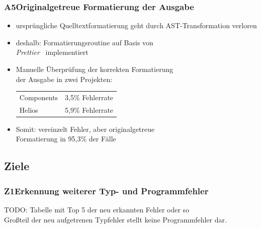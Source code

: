       \begin{frame}
        \frametitle{A5\hspace{0.75em}Originalgetreue Formatierung der Ausgabe}
        \begin{itemize}
          \item ursprüngliche Quelltextformatierung geht durch AST-Transformation verloren
          \item deshalb: Formatierungsroutine auf Basis von\\\textit{Prettier}~\autocite{SOFTWARE:PRETTIER} implementiert
          \item Manuelle Überprüfung der korrekten Formatierung\\der Ausgabe in zwei Projekten:\\
            \medskip
            {
              \footnotesize
              \begin{tabu} to 
                Components & 3,5\% Fehlerrate \\
                Helios     & 5,9\% Fehlerrate \\
              \end{tabu}
            }
          \item Somit: vereinzelt Fehler, aber originalgetreue\\Formatierung in 95,3\% der Fälle
        \end{itemize}
      \end{frame}

    \subsection{Ziele}

      \begin{frame}
        \frametitle{Z1\hspace{0.75em}Erkennung weiterer Typ- und Programmfehler}

        TODO: Tabelle mit Top 5 der neu erkannten Fehler oder so\\

        Großteil der neu aufgetrenen Typfehler stellt keine Programmfehler dar.
      \end{frame}

